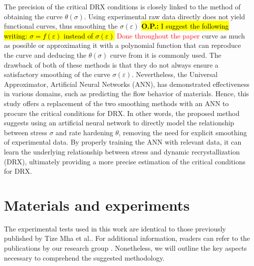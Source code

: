 \documentclass[metals,article,submit,pdftex,moreauthors]{Definitions/mdpi}
\makeatletter
\DeclareRobustCommand{\eal}{et al.\@\xspace}
\DeclareRobustCommand{\OP}[1]{\begingroup\sethlcolor{VWyellow}\textcolor{red}{\hl{\textbf{O.P.:} #1}}\endgroup}
\makeatother
\begin{document}
The precision of the critical DRX conditions is closely linked to the method of obtaining the curve $\theta(\sigma)$.
Using experimental raw data directly does not yield functional curves, thus smoothing the $\sigma(\varepsilon)$ \OP{I suggest the following writing: $\sigma=f(\varepsilon)$ instead of $\sigma(\varepsilon)$} \textcolor{red}{Done throughout the paper} curve as much as possible or approximating it with a polynomial function that can reproduce the curve and deducing the $\theta(\sigma)$ curve from it is commonly used.
The drawback of both of these methods is that they do not always ensure a satisfactory smoothing of the curve $\sigma(\varepsilon)$.
Nevertheless, the Universal Approximator, Artificial Neural Networks (ANN), has demonstrated effectiveness in various domains, such as predicting the flow behavior of materials.
Hence, this study offers a replacement of the two smoothing methods with an ANN to procure the critical conditions for DRX.
In other words, the proposed method suggests using an artificial neural network to directly model the relationship between stress $\sigma$ and rate hardening $\theta$, removing the need for explicit smoothing of experimental data.
By properly training the ANN with relevant data, it can learn the underlying relationship between stress and dynamic recrystallization (DRX), ultimately providing a more precise estimation of the critical conditions for DRX.

\section{Materials and experiments\label{sec:MaterialsExperiments}}

The experimental tests used in this work are identical to those previously published by Tize Mha \eal \cite{TizeMha-2023}.
For additional information, readers can refer to the publications by our research group \cite{Pantale-2021, Pantale-2023}.
Nonetheless, we will outline the key aspects necessary to comprehend the suggested methodology.
\end{document}
